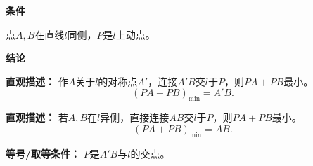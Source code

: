 \begin{statementbox}
	\textbf{\textcolor{CStatement}{条件}}
	\begin{description}[style=nextline, leftmargin=2.8em, labelsep=0.5em, itemsep=0.35em]
		\item[\textbf{\textcolor{CStatement}{条件1（定点同侧）：}}] 点$A,B$在直线$l$同侧，$P$是$l$上动点。
	\end{description}

	\textbf{\textcolor{CStatement}{结论}}
	\begin{description}[style=nextline, leftmargin=2.8em, labelsep=0.5em, itemsep=0.45em]
		\item[\textbf{\textcolor{CStatement}{结论一（对称转化）：}}]
			\textbf{\textcolor{CStatement}{直观描述：}}
			作$A$关于$l$的对称点$A'$，连接$A'B$交$l$于$P$，则$PA+PB$最小。
			\[
				(PA+PB)_{\min}=A'B.
			\]

		\item[\textbf{\textcolor{CStatement}{常见变形（异侧情形）：}}]
			\textbf{\textcolor{CStatement}{直观描述：}}
			若$A,B$在$l$异侧，直接连接$AB$交$l$于$P$，则$PA+PB$最小。
			\[
				(PA+PB)_{\min}=AB.
			\]
	\end{description}

	\textbf{\textcolor{CStatement}{等号/取等条件：}}
	$P$是$A'B$与$l$的交点。
\end{statementbox}
